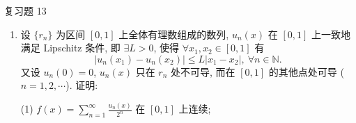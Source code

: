 \begin{exblock}{复习题 13}
\begin{enumerate}
  (1) 函数列 $\left(1+\frac{x}{n}\right)^{n}$ ($n=1,2,\cdots$) 在 $[0,1]$ 上一致收敛于 $\mathrm{e}^{x}$;

  (2) 函数列 $f_{n}(x)=\dfrac{1}{\mathrm{e}^{\frac{x}{n}}+\left(1+\frac{x}{n}\right)^{n}}$ ($n=1,2,\cdots$) 在 $[0,1]$ 上一致收敛于 $\dfrac{1}{1+\mathrm{e}^{x}}$;

  (3) $\lim\limits_{n\to+\infty}\int_{0}^{1}\frac{\mathrm{d}x}{\mathrm{e}^{\frac{x}{n}}+\left(1+\frac{x}{n}\right)^{n}}=1+\ln\frac{2}{1+\mathrm{e}}$.
  \item 设 $\{r_{n}\}$ 为区间 $[0,1]$ 上全体有理数组成的数列, $u_{n}(x)$ 在 $[0,1]$ 上一致地满足 Lipschitz 条件, 即 $\exists L>0$, 使得 $\forall x_{1},x_{2}\in[0,1]$ 有
  \[
    \left|u_{n}(x_{1})-u_{n}(x_{2})\right|\leqslant L|x_{1}-x_{2}|,\ \forall n\in\mathbb{N}.
\]
  又设 $u_{n}(0)=0$, $u_{n}(x)$ 只在 $r_{n}$ 处不可导, 而在 $[0,1]$ 的其他点处可导 ($n=1,2,\cdots$). 证明:

  (1) $f(x)=\sum_{n=1}^{\infty}\frac{u_{n}(x)}{2^{n}}$ 在 $[0,1]$ 上连续;


\end{enumerate}
\end{exblock}
